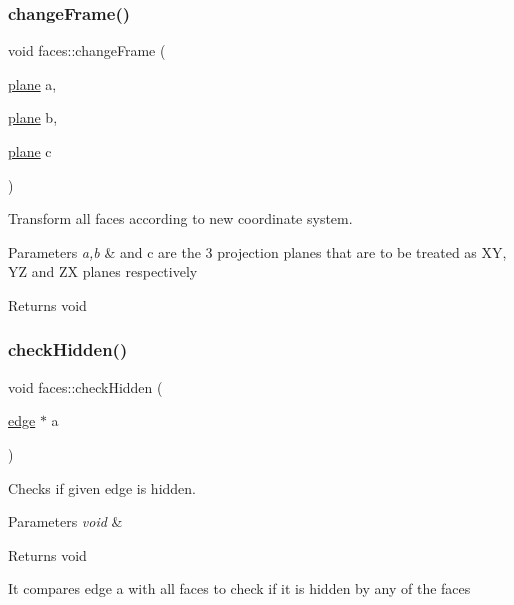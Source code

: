 \subsubsection{\texorpdfstring{change\+Frame()}{changeFrame()}}
{\footnotesize\ttfamily void faces\+::change\+Frame (\begin{DoxyParamCaption}\item[{\mbox{\hyperlink{structplane}{plane}}}]{a,  }\item[{\mbox{\hyperlink{structplane}{plane}}}]{b,  }\item[{\mbox{\hyperlink{structplane}{plane}}}]{c }\end{DoxyParamCaption})}



Transform all faces according to new coordinate system. 


\begin{DoxyParams}{Parameters}
{\em a,b} & and c are the 3 projection planes that are to be treated as XY, YZ and ZX planes respectively \\
\hline
\end{DoxyParams}
\begin{DoxyReturn}{Returns}
void 
\end{DoxyReturn}
\mbox{\label{classfaces_a1f56842eabd141ff237689834b3efb8c}} 
\subsubsection{\texorpdfstring{check\+Hidden()}{checkHidden()}}
{\footnotesize\ttfamily void faces\+::check\+Hidden (\begin{DoxyParamCaption}\item[{\mbox{\hyperlink{structedge}{edge}} $\ast$}]{a }\end{DoxyParamCaption})}



Checks if given edge is hidden. 


\begin{DoxyParams}{Parameters}
{\em void} & \\
\hline
\end{DoxyParams}
\begin{DoxyReturn}{Returns}
void
\end{DoxyReturn}
It compares edge a with all faces to check if it is hidden by any of the faces \mbox{\label{classfaces_abdf6691e92a27f82d0ee45f7ab87a429}} 
